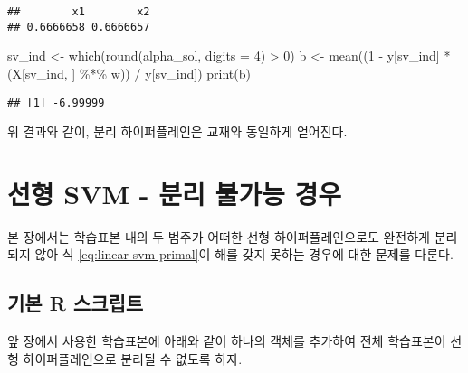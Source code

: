 \documentclass[
]{book}
\newenvironment{Shaded}{\begin{snugshade}}{\end{snugshade}}
\newcommand{\AttributeTok}[1]{\textcolor[rgb]{0.77,0.63,0.00}{#1}}
\newcommand{\DecValTok}[1]{\textcolor[rgb]{0.00,0.00,0.81}{#1}}
\newcommand{\FunctionTok}[1]{\textcolor[rgb]{0.00,0.00,0.00}{#1}}
\newcommand{\NormalTok}[1]{#1}
\newcommand{\OtherTok}[1]{\textcolor[rgb]{0.56,0.35,0.01}{#1}}
\newcommand{\SpecialCharTok}[1]{\textcolor[rgb]{0.00,0.00,0.00}{#1}}
\begin{document}
\begin{verbatim}
##        x1        x2 
## 0.6666658 0.6666657
\end{verbatim}

\begin{Shaded}
\begin{Highlighting}[]
\NormalTok{sv\_ind }\OtherTok{\textless{}{-}} \FunctionTok{which}\NormalTok{(}\FunctionTok{round}\NormalTok{(alpha\_sol, }\AttributeTok{digits =} \DecValTok{4}\NormalTok{) }\SpecialCharTok{\textgreater{}} \DecValTok{0}\NormalTok{)}
\NormalTok{b }\OtherTok{\textless{}{-}} \FunctionTok{mean}\NormalTok{((}\DecValTok{1} \SpecialCharTok{{-}}\NormalTok{ y[sv\_ind] }\SpecialCharTok{*}\NormalTok{ (X[sv\_ind, ] }\SpecialCharTok{\%*\%}\NormalTok{ w)) }\SpecialCharTok{/}\NormalTok{ y[sv\_ind])}
\FunctionTok{print}\NormalTok{(b)}
\end{Highlighting}
\end{Shaded}

\begin{verbatim}
## [1] -6.99999
\end{verbatim}

위 결과와 같이, 분리 하이퍼플레인은 교재와 동일하게 얻어진다.

\hypertarget{linear-svm-inseparable}{%
\section{선형 SVM - 분리 불가능 경우}\label{linear-svm-inseparable}}

본 장에서는 학습표본 내의 두 범주가 어떠한 선형 하이퍼플레인으로도 완전하게 분리되지 않아 식 \eqref{eq:linear-svm-primal}이 해를 갖지 못하는 경우에 대한 문제를 다룬다.

\hypertarget{linear-svm-inseparable-basic-script}{%
\subsection{기본 R 스크립트}\label{linear-svm-inseparable-basic-script}}

앞 장에서 사용한 학습표본에 아래와 같이 하나의 객체를 추가하여 전체 학습표본이 선형 하이퍼플레인으로 분리될 수 없도록 하자.
\end{document}
